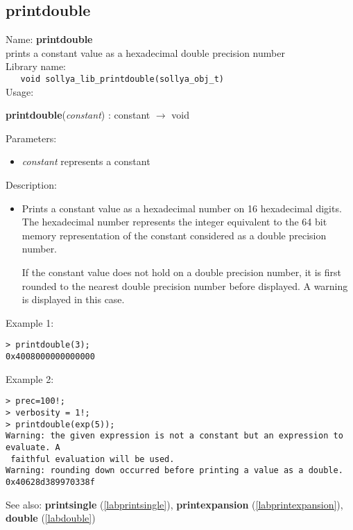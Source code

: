 \subsection{printdouble}
\label{labprintdouble}
\noindent Name: \textbf{printdouble}\\
\phantom{aaa}prints a constant value as a hexadecimal double precision number\\[0.2cm]
\noindent Library name:\\
\verb|   void sollya_lib_printdouble(sollya_obj_t)|\\[0.2cm]
\noindent Usage: 
\begin{center}
\textbf{printdouble}(\emph{constant}) : \textsf{constant} $\rightarrow$ \textsf{void}\\
\end{center}
Parameters: 
\begin{itemize}
\item \emph{constant} represents a constant
\end{itemize}
\noindent Description: \begin{itemize}

\item Prints a constant value as a hexadecimal number on 16 hexadecimal
   digits. The hexadecimal number represents the integer equivalent to
   the 64 bit memory representation of the constant considered as a
   double precision number.
    
   If the constant value does not hold on a double precision number, it
   is first rounded to the nearest double precision number before
   displayed. A warning is displayed in this case.
\end{itemize}
\noindent Example 1: 
\begin{center}\begin{minipage}{15cm}\begin{Verbatim}[frame=single]
> printdouble(3);
0x4008000000000000
\end{Verbatim}
\end{minipage}\end{center}
\noindent Example 2: 
\begin{center}\begin{minipage}{15cm}\begin{Verbatim}[frame=single]
> prec=100!;
> verbosity = 1!;
> printdouble(exp(5));
Warning: the given expression is not a constant but an expression to evaluate. A
 faithful evaluation will be used.
Warning: rounding down occurred before printing a value as a double.
0x40628d389970338f
\end{Verbatim}
\end{minipage}\end{center}
See also: \textbf{printsingle} (\ref{labprintsingle}), \textbf{printexpansion} (\ref{labprintexpansion}), \textbf{double} (\ref{labdouble})
